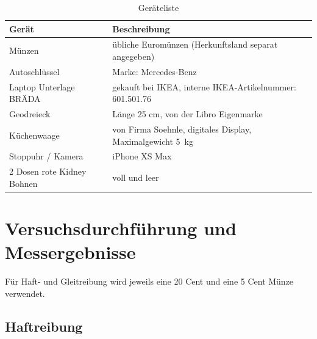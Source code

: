 \documentclass{article}
\begin{document}
\begin{table}[H]
\caption{Geräteliste}



\begin{tabular}{lll}
Gerät  & Beschreibung \\
\hline
Münzen  & übliche Euromünzen (Herkunftsland separat angegeben) \\
Autoschlüssel & Marke: Mercedes-Benz \\
Laptop Unterlage BRÄDA & gekauft bei IKEA, interne IKEA-Artikelnummer:  601.501.76 \\
Geodreieck & Länge 25 cm, von der Libro Eigenmarke \\
Küchenwaage & von Firma Soehnle, digitales Display, Maximalgewicht 5~kg \\
Stoppuhr / Kamera & iPhone XS Max \\
2 Dosen rote Kidney Bohnen & voll und leer 
\end{tabular}
\end{table}

\newpage
\section{Versuchsdurchführung und Messergebnisse}

Für Haft- und Gleitreibung wird jeweils eine 20 Cent und eine 5 Cent Münze verwendet. 


\subsection{Haftreibung}
\end{document}
